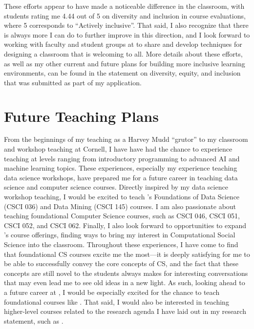 \documentclass[12pt,letterpaper]{article}
\newcommand\closingsent\lateachingend
\newcommand\closingsent\genteachingend
\begin{document}
These efforts appear to have made a noticeable difference in the classroom, with students rating me 4.44 out of 5 on diversity and inclusion in course evaluations, where 5 corresponds to ``Actively inclusive''.
That said, I also recognize that there is always more I can do to further improve in this direction, and I look forward to working with faculty and student groups at \schoolname to share and develop techniques for designing a classroom that is welcoming to all.
\iflongdei
More details about these efforts, as well as my other current and future plans for building more inclusive learning environments, can be found in the statement on diversity, equity, and inclusion that was submitted as part of my application.
\else
%
\fi

\section{Future Teaching Plans}
From the beginnings of my teaching as a Harvey Mudd ``grutor'' to my classroom and workshop teaching at Cornell, I have have had the chance to experience teaching at levels ranging from introductory programming to advanced AI and machine learning topics.
\ifcmcspecialcase
These experiences, especially my experience teaching data science workshops, have prepared me for a future career in teaching data science and computer science courses.
Directly inspired by my data science workshop teaching, I would be excited to teach \schoolname's Foundations of Data Science (CSCI 036) and Data Mining (CSCI 145) courses.
I am also passionate about teaching foundational Computer Science courses, such as CSCI 046, CSCI 051, CSCI 052, and CSCI 062.
Finally, I also look forward to opportunities to expand \schoolname's course offerings, finding ways to bring my interest in Computational Social Science into the classroom.
\else
Throughout these experiences, I have come to find that foundational CS courses excite me the most---it is deeply satisfying for me to be able to successfully convey the core concepts of CS, and the fact that these concepts are still novel to the students always makes for interesting conversations that may even lead me to see old ideas in a new light.
As such, looking ahead to a future career at \schoolname, I would be especially excited for the chance to teach foundational courses like \schoolintrocourses.
That said, I would also be interested in teaching higher-level courses related to the research agenda I have laid out in my research statement, such as \schooladvcourses.
\closingsent
\fi
\end{document}
